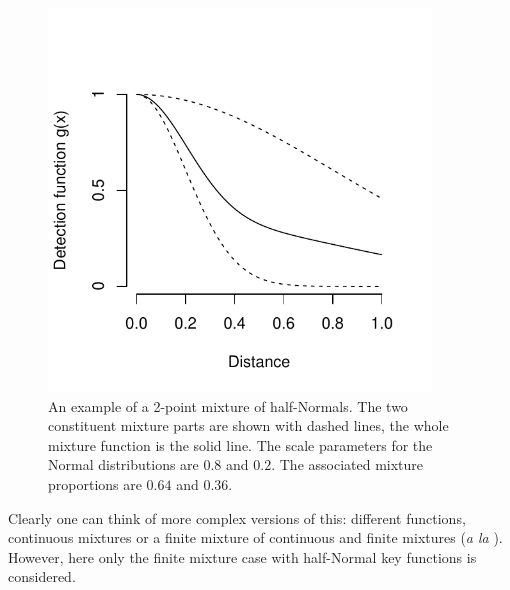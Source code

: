 \begin{figure}
\centering
\includegraphics[width=4in]{mix/figs/2ptdia.pdf}
\caption{An example of a 2-point mixture of half-Normals. The two constituent mixture parts are shown with dashed lines, the whole mixture function is the solid line. The scale parameters for the Normal distributions are $0.8$ and $0.2$. The associated mixture proportions are $0.64$ and $0.36$.}
\label{2ptdia}
\end{figure}

Clearly one can think of more complex versions of this: different functions, continuous mixtures or a finite mixture of continuous and finite mixtures (\textit{a la} \cite{morgan08}). However, here only the finite mixture case with half-Normal key functions is considered.

